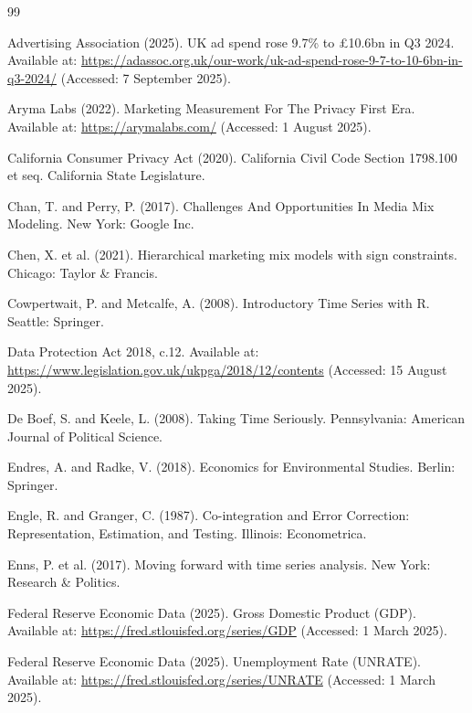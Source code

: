 \documentclass[11pt, a4paper]{article}
\begin{document}
\begin{thebibliography}{99}

Advertising Association (2025). UK ad spend rose 9.7\% to £10.6bn in Q3 2024. Available at: \url{https://adassoc.org.uk/our-work/uk-ad-spend-rose-9-7-to-10-6bn-in-q3-2024/} (Accessed: 7 September 2025).

Aryma Labs (2022). Marketing Measurement For The Privacy First Era. Available at: \url{https://arymalabs.com/} (Accessed: 1 August 2025).

California Consumer Privacy Act (2020). California Civil Code Section 1798.100 et seq. California State Legislature.

Chan, T. and Perry, P. (2017). Challenges And Opportunities In Media Mix Modeling. New York: Google Inc.

Chen, X. et al. (2021). Hierarchical marketing mix models with sign constraints. Chicago: Taylor \& Francis.

Cowpertwait, P. and Metcalfe, A. (2008). Introductory Time Series with R. Seattle: Springer.

Data Protection Act 2018, c.12. Available at: \url{https://www.legislation.gov.uk/ukpga/2018/12/contents} (Accessed: 15 August 2025).

De Boef, S. and Keele, L. (2008). Taking Time Seriously. Pennsylvania: American Journal of Political Science.

Endres, A. and Radke, V. (2018). Economics for Environmental Studies. Berlin: Springer.

Engle, R. and Granger, C. (1987). Co-integration and Error Correction: Representation, Estimation, and Testing. Illinois: Econometrica.

Enns, P. et al. (2017). Moving forward with time series analysis. New York: Research \& Politics.

Federal Reserve Economic Data (2025). Gross Domestic Product (GDP). Available at: \url{https://fred.stlouisfed.org/series/GDP} (Accessed: 1 March 2025).

Federal Reserve Economic Data (2025). Unemployment Rate (UNRATE). Available at: \url{https://fred.stlouisfed.org/series/UNRATE} (Accessed: 1 March 2025).


\end{thebibliography}
\end{document}

